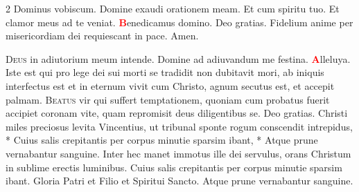 \begin{multicols}{2}
\newline {} Dominus vobiscum.  Domine exaudi orationem meam.
\newline \R Et cum spiritu tuo.  Et clamor meus ad te veniat.
\newline \textcolor{Red}{\bfseries B}enedicamus domino. \R Deo gratias.
\newline {}
\newline Fidelium anime per misericordiam dei requiescant in pace. \R Amen.
\newline {}

\newline {}
\newline {}
\newline {}
\lettrine[lines=2]{\zallmancaps \color{Blue} D}{eus} in adiutorium meum intende. \R Domine ad adiuvandum me festina. 
\newline \doxology \textcolor{Red}{\bfseries A}lleluya.
\newline {} Iste est qui pro lege dei sui morti se tradidit non dubitavit mori, ab iniquis interfectus est et in eternum vivit cum Christo, agnum secutus est, et accepit palmam.
\newline {}
\lettrine[lines=2]{\zallmancaps \color{Red} B}{eatus} vir qui suffert temptationem, quoniam cum probatus fuerit accipiet coronam vite, quam repromisit deus diligentibus se. \R Deo gratias.
\newline \R Christi miles preciosus levita Vincentius, ut tribunal sponte rogum conscendit intrepidus, * Cuius salis crepitantis per corpus minutie sparsim ibant, * Atque prune vernabantur sanguine. \V Inter hec manet immotus ille dei servulus, orans Christum in sublime erectis luminibus. Cuius salis crepitantis per corpus minutie sparsim ibant. Gloria Patri et Filio et Spiritui Sancto. Atque prune vernabantur sanguine.
\newline {}
\end{multicols}
